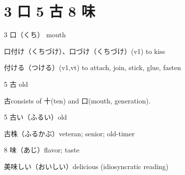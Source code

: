 \section{3 口 5 古 8 味}

3 口（くち） mouth

口付け（くちづけ）、口づけ（くちづけ）(v1) to kiss

付ける（つける）(v1,vt) to attach, join, stick, glue, fasten

5 古 old

古consists of 十(ten) and 口(mouth, generation).

5 古い（ふるい）old

古株（ふるかぶ）veteran; senior; old-timer

8 味（あじ）flavor; taste

美味しい（おいしい）delicious (idiosyncratic reading)
